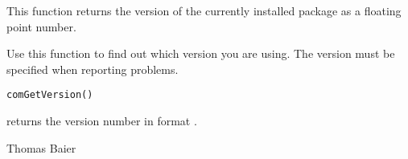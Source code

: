 \begin{Description}\relax
This function returns the version of the currently installed 
package as a floating point number.

Use this function to find out which version you are using. The version must
be specified when reporting problems.
\end{Description}
\begin{Usage}
\begin{verbatim}
comGetVersion()
\end{verbatim}
\end{Usage}
\begin{Arguments}
\end{Arguments}
\begin{Value}
 returns the version number in format .
\end{Value}
\begin{Author}\relax
Thomas Baier
\end{Author}

